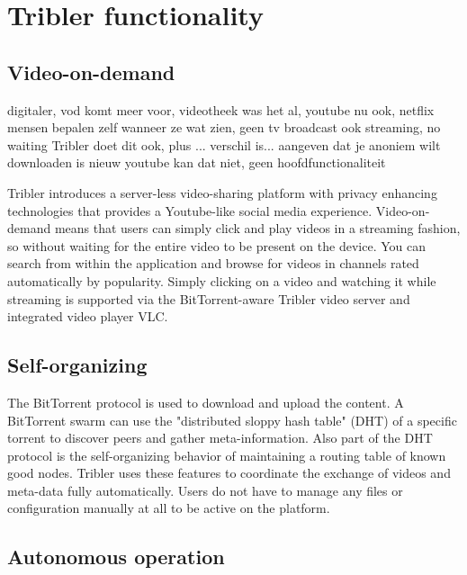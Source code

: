 \chapter{Tribler functionality}


\section{Video-on-demand}

digitaler, vod komt meer voor, videotheek was het al, youtube nu ook, netflix
mensen bepalen zelf wanneer ze wat zien, geen tv broadcast
ook streaming, no waiting
Tribler doet dit ook, plus ...
verschil is...
aangeven dat je anoniem wilt downloaden is nieuw
youtube kan dat niet, geen hoofdfunctionaliteit

Tribler introduces a server-less video-sharing platform with privacy enhancing technologies that provides a Youtube-like social media experience.
Video-on-demand means that users can simply click and play videos in a streaming fashion, so without waiting for the entire video to be present on the device. %
You can search from within the application and browse for videos in channels rated automatically by popularity.
Simply clicking on a video and watching it while streaming is supported via the BitTorrent-aware Tribler video server and integrated video player VLC.


\section{Self-organizing}

The BitTorrent protocol is used to download and upload the content.
A BitTorrent swarm can use the "distributed sloppy hash table" (DHT) of a specific torrent to discover peers and gather meta-information.
Also part of the DHT protocol is the self-organizing behavior of maintaining a routing table of known good nodes.
Tribler uses these features to coordinate the exchange of videos and meta-data fully automatically.
Users do not have to manage any files or configuration manually at all to be active on the platform.


\section{Autonomous operation}

